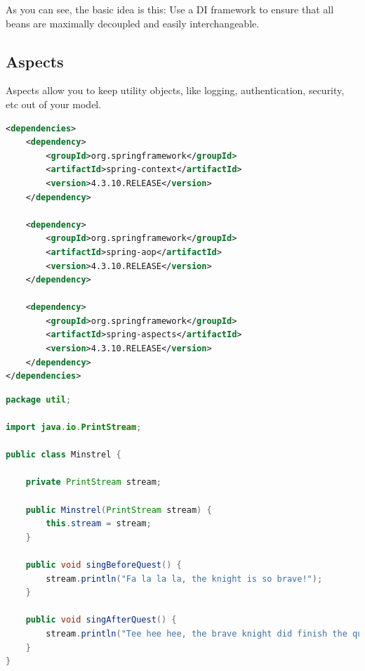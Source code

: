 As you can see, the basic idea is this: 
Use a DI framework to ensure that all beans are maximally decoupled and easily interchangeable.


\subsection{Aspects}

Aspects allow you to keep utility objects, like logging, authentication, security, etc out of your model. 

\begin{lstlisting}[language=xml]
<dependencies>
	<dependency>
		<groupId>org.springframework</groupId>
		<artifactId>spring-context</artifactId>
		<version>4.3.10.RELEASE</version>
	</dependency>

	<dependency>
		<groupId>org.springframework</groupId>
		<artifactId>spring-aop</artifactId>
		<version>4.3.10.RELEASE</version>
	</dependency>

	<dependency>
		<groupId>org.springframework</groupId>
		<artifactId>spring-aspects</artifactId>
		<version>4.3.10.RELEASE</version>
	</dependency>
</dependencies>
\end{lstlisting}

\begin{lstlisting}[language=java]
package util;

import java.io.PrintStream;

public class Minstrel {
	
	private PrintStream stream;

	public Minstrel(PrintStream stream) {
		this.stream = stream;
	}
	
	public void singBeforeQuest() {
		stream.println("Fa la la la, the knight is so brave!");
	}
	
	public void singAfterQuest() {
		stream.println("Tee hee hee, the brave knight did finish the quest!");
	}
}
\end{lstlisting}

